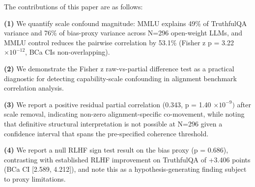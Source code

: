 The contributions of this paper are as follows:

\textbf{(1)} We quantify scale confound magnitude: MMLU explains 49\% of TruthfulQA variance and 76\% of bias-proxy variance across N=296 open-weight LLMs, and MMLU control reduces the pairwise correlation by 53.1\% (Fisher z p = 3.22 $\times 10^{-12}$, BCa CIs non-overlapping).

\textbf{(2)} We demonstrate the Fisher z raw-vs-partial difference test as a practical diagnostic for detecting capability-scale confounding in alignment benchmark correlation analysis.

\textbf{(3)} We report a positive residual partial correlation (0.343, p = 1.40 $\times 10^{-9})$ after scale removal, indicating non-zero alignment-specific co-movement, while noting that definitive structural interpretation is not possible at N=296 given a confidence interval that spans the pre-specified coherence threshold.

\textbf{(4)} We report a null RLHF sign test result on the bias proxy (p = 0.686), contrasting with established RLHF improvement on TruthfulQA of +3.406 points (BCa CI [2.589, 4.212]), and note this as a hypothesis-generating finding subject to proxy limitations.

